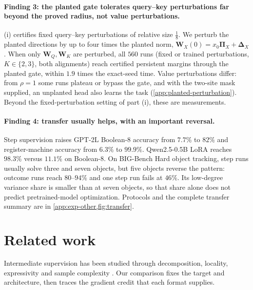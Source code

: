 \paragraph{Finding 3: the planted gate tolerates query--key perturbations far beyond the proved radius, not value perturbations.}
(i) certifies fixed query--key perturbations of relative size $\frac18$. We perturb the planted directions by up to
four times the planted norm, $\mathbf W_X(0)=x_0\bm\Pi_X+\bm\Delta_X$. When only $\mathbf W_Q,\mathbf W_K$ are perturbed, all $560$ runs
(fixed or trained perturbations, $K\in\{2,3\}$, both alignments) reach certified persistent margins through the planted gate, within
$1.9$ times the exact-seed time. Value perturbations differ: from $\rho=1$ some runs plateau or bypass the gate, and with the two-site
mask supplied, an unplanted head also learns the task (\cref{app:planted-perturbation}). Beyond the fixed-perturbation setting of part (i), these are measurements.

\paragraph{Finding 4: transfer usually helps, with an important reversal.}
Step supervision raises GPT-2L Boolean-8 accuracy from $7.7\%$ to $82\%$ and register-machine
accuracy from $6.3\%$ to $99.9\%$. Qwen2.5-0.5B LoRA reaches $98.3\%$ versus $11.1\%$
on Boolean-8. On BIG-Bench Hard object tracking, step runs usually solve three and seven
objects, but five objects reverse the pattern: outcome runs reach $80$--$94\%$ and one
step run fails at $46\%$. Its low-degree variance share is smaller than at seven objects,
so that share alone does not predict pretrained-model optimization. Protocols and the
complete transfer summary are in \cref{app:exp-other,fig:transfer}.

\section{Related work}
\label{sec:related}

Intermediate supervision has been studied through decomposition, locality, expressivity and
sample complexity \citep{nye2021scratchpads,wies2023subtask,prystawski2023think,abbe2024globality,
feng2023towards,merrill2024expressive,malach2023autoregressive,hanneke2026samplecomplexityautoregressivereasoning,wen2024sparse}.
Our comparison fixes the target and architecture, then traces the gradient credit that each format supplies.

